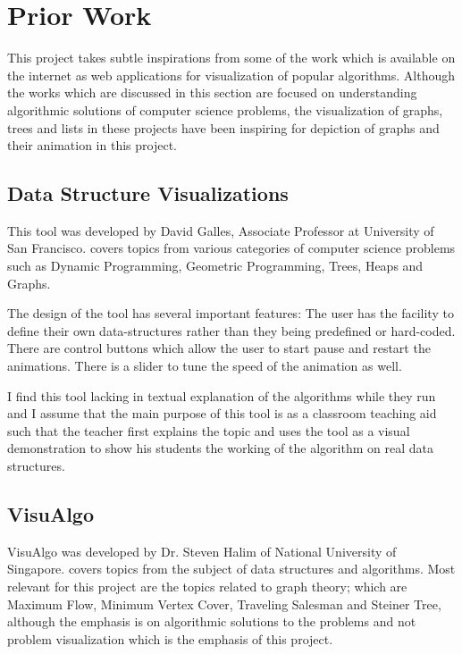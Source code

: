 \section{Prior Work}
This project takes subtle inspirations from some of the work which is available
on the internet as web applications for visualization of popular algorithms.
Although the works which are discussed in this section are focused on
understanding algorithmic solutions of computer science problems, the
visualization of graphs, trees and lists in these projects have been inspiring
for depiction of graphs and their animation in this project.

\subsection{Data Structure Visualizations}
\label{priorWork: datastrucvisu}
This tool was developed by David Galles, Associate Professor at University of San
Francisco. \cite{Galles} covers topics
from various categories of computer science problems such as Dynamic
Programming, Geometric Programming, Trees, Heaps and Graphs.

The design of the tool has several important features: The user has the
facility to define their own data-structures rather than they being predefined or
hard-coded. There are control buttons which allow the user to start pause and
restart the animations. There is a slider to tune the speed of the animation as
well.

I find this tool lacking in textual explanation of the algorithms while they run and I assume that the main purpose of this tool is as a classroom teaching aid such that the
teacher first explains the topic and uses the tool as a visual demonstration to
show his students the working of the algorithm on real data structures.

\subsection{VisuAlgo}
\label{priorWork: visualgo}
VisuAlgo was developed by Dr. Steven Halim of National University of
Singapore. \cite{HalimVisu} covers topics from the
subject of data structures and algorithms. Most relevant for this project are
the topics related to graph theory; which are Maximum Flow, Minimum Vertex
Cover, Traveling Salesman and Steiner Tree, although the emphasis is on
algorithmic solutions to the problems and not problem visualization which is
the emphasis of this project.

